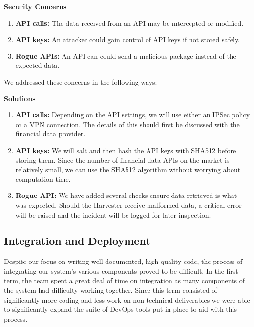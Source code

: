 \documentclass[main.tex]{subfiles}
\begin{document}
\newline
\textbf{Security Concerns}
\begin{enumerate}
    \item \textbf{API calls: }The data received from an API may be intercepted or modified.
    \item \textbf{API keys: }An attacker could gain control of API keys if not stored safely.
    \item \textbf{Rogue APIs: }An API can could send a malicious package instead of the expected data.
\end{enumerate}

We addressed these concerns in the following ways:

\textbf{Solutions}
\begin{enumerate}
    \item \textbf{API calls: }Depending on the API settings, we will use either an IPSec policy or a VPN connection. The details of this should first be discussed with the financial data provider.
    \item \textbf{API keys: }We will salt and then hash the API keys with SHA512 before storing them. Since the number of financial data APIs on the market is relatively small, we can use the SHA512 algorithm without worrying about computation time.
    \item \textbf{Rogue API: }We have added several checks ensure data retrieved is what was expected. Should the Harvester receive malformed data, a critical error will be raised and the incident will be logged for later inspection. 
\end{enumerate}

\subsection{Integration and Deployment}
\label{Coding Standards}


Despite our focus on writing well documented, high quality code, the process of integrating our system's various components proved to be difficult. In the first term, the team spent a great deal of time on integration as many components of the system had difficulty working together. Since this term consisted of significantly more coding and less work on non-technical deliverables we were able to significantly expand the suite of DevOps tools put in place to aid with this process\cite{DevOps}.
\end{document}
